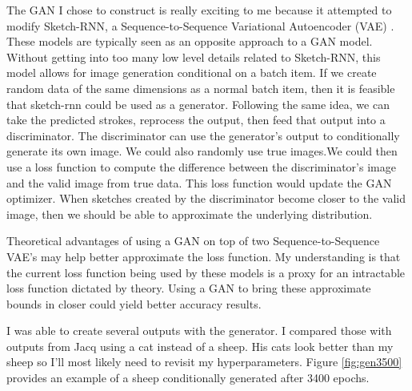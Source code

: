 \documentclass[a4paper,12pt]{article} %
\begin{document}
The GAN I chose to construct is really exciting to me because it attempted
to modify Sketch-RNN, a Sequence-to-Sequence Variational Autoencoder (VAE)
\cite{DBLP:journals/corr/HaE17}. These models are typically seen as an
opposite approach to a GAN model. Without getting into too many low level
details related to Sketch-RNN, this model allows for image generation
conditional on a batch item. If we create random data of the same dimensions
as a normal batch item, then it is feasible that sketch-rnn could be used
as a generator. Following the same idea, we can take the predicted strokes,
reprocess the output, then feed that output into a discriminator. The
discriminator can use the generator's output to conditionally generate its
own image. We could also randomly use true images.We could then use a loss
function to compute the difference between the discriminator's image and the
valid image from true data.  This loss function would update the GAN
optimizer. When sketches created by the discriminator become closer to the
valid image, then we should be able to approximate the underlying
distribution.\newline

Theoretical advantages of using a GAN on top of two Sequence-to-Sequence
VAE's may help better approximate the loss function. My understanding is
that the current loss function being used by these models is a proxy for
an intractable loss function dictated by theory. Using a GAN to bring these
approximate bounds in closer could yield better accuracy results. \newline

I was able to create several outputs with the generator. I compared those
with outputs from Jacq \cite{alexisja77:online} using a cat instead of a
sheep. His cats look better than my sheep so I'll most likely need to
revisit my hyperparameters. Figure \ref{fig:gen3500} provides an example
of a sheep conditionally generated after 3400 epochs. \newline
\end{document}
